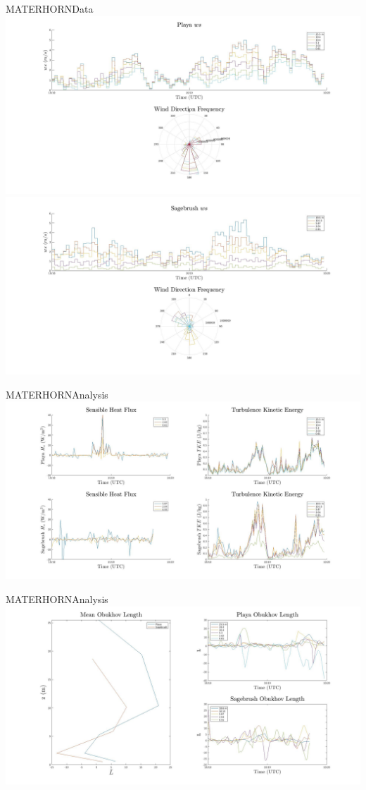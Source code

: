 \documentclass{beamer}
\begin{document}
\begin{frame}{MATERHORN}{Data}
	\includegraphics[width=\linewidth]{plots/playawind}
	\endminipage\hfill
	\includegraphics[width=\linewidth]{plots/sagewind}
	\endminipage\hfill
\end{frame}

\begin{frame}{MATERHORN}{Analysis}
	\includegraphics[width=\linewidth]{plots/hstkeimproved}
\end{frame}

\begin{frame}{MATERHORN}{Analysis}
	\includegraphics[width=\linewidth]{plots/oblength}
\end{frame}
\end{document}
